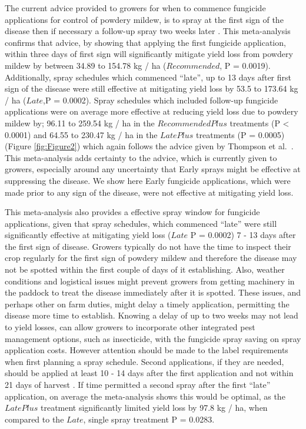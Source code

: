 \documentclass[agronomy,article,submit,moreauthors,pdftex]{mdpi}
\begin{document}
The current advice provided to growers for when to commence fungicide applications for control of powdery mildew, is to spray at the first sign of the disease then if necessary a follow-up spray two weeks later \citep{SueThompson2016, Sparks2017}.
This meta-analysis confirms that advice, by showing that applying the first fungicide application, within three days of first sign will significantly mitigate yield loss from powdery mildew by between 34.89 to 154.78 kg / ha (\(Recommended\), P = 0.0019).
Additionally, spray schedules which commenced ``late'', up to 13 days after first sign of the disease were still effective at mitigating yield loss by 53.5 to 173.64 kg / ha (\(Late\),P = 0.0002).
Spray schedules which included follow-up fungicide applications were on average more effective at reducing yield loss due to powdery mildew by;
96.11 to 259.54 kg / ha in the \(RecommendedPlus\) treatments (P \textless{} 0.0001) and
64.55 to 230.47 kg / ha in the \(LatePlus\) treatments (P = 0.0005) (Figure \ref{fig:Figure2})
which again follows the advice given by Thompson et al.~\citep{SueThompson2016}.
This meta-analysis adds certainty to the advice, which is currently given to growers, especially around any uncertainty that Early sprays might be effective at suppressing the disease.
We show here Early fungicide applications, which were made prior to any sign of the disease, were not effective at mitigating yield loss.

This meta-analysis also provides a effective spray window for fungicide applications, given that spray schedules, which commenced ``late'' were still significantly effective at mitigating yield loss (\(Late\) P = 0.0002) 7 - 13 days after the first sign of disease.
Growers typically do not have the time to inspect their crop regularly for the first sign of powdery mildew and therefore the disease may not be spotted within the first couple of days of it establishing.
Also, weather conditions and logistical issues might prevent growers from getting machinery in the paddock to treat the disease immediately after it is spotted.
These issues, and perhaps other on farm duties, might delay a timely application, permitting the disease more time to establish.
Knowing a delay of up to two weeks may not lead to yield losses, can allow growers to incorporate other integrated pest management options, such as insecticide, with the fungicide spray saving on spray application costs.
However attention should be made to the label requirements when first planning a spray schedule.
Second applications, if they are needed, should be applied at least 10 - 14 days after the first application and not within 21 days of harvest \citep{APVMAcustodia}.
If time permitted a second spray after the first ``late'' application, on average the meta-analysis shows this would be optimal, as the \(LatePlus\) treatment significantly limited yield loss by 97.8 kg / ha, when compared to the \(Late\), single spray treatment P = 0.0283.
\end{document}
